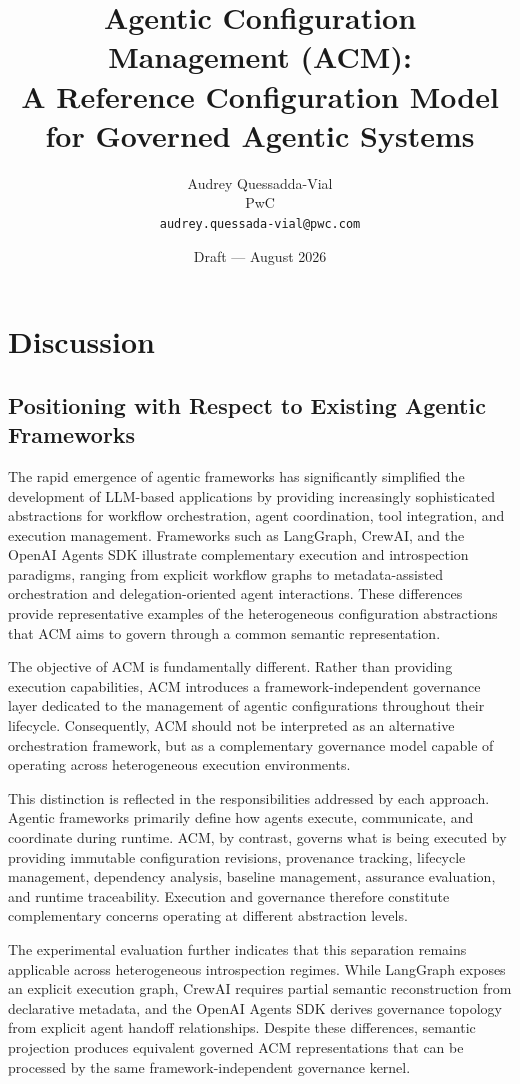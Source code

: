 \documentclass[10pt]{article}
\title{\textbf{Agentic Configuration Management (ACM):\\A Reference Configuration Model for Governed Agentic Systems}}
\author{
  Audrey Quessadda-Vial\\
  PwC\\
  \texttt{audrey.quessada-vial@pwc.com}
}
\date{Draft --- August 2026}
\begin{document}
\maketitle

\section{Discussion}
\label{sec:discussion}
\subsection{Positioning with Respect to Existing Agentic Frameworks}
\label{sec:positioning}

The rapid emergence of agentic frameworks has significantly simplified the development of LLM-based applications by providing increasingly sophisticated abstractions for workflow orchestration, agent coordination, tool integration, and execution management. Frameworks such as LangGraph, CrewAI, and the OpenAI Agents SDK illustrate complementary execution and introspection paradigms, ranging from explicit workflow graphs to metadata-assisted orchestration and delegation-oriented agent interactions. These differences provide representative examples of the heterogeneous configuration abstractions that ACM aims to govern through a common semantic representation.

The objective of ACM is fundamentally different. Rather than providing execution capabilities, ACM introduces a framework-independent governance layer dedicated to the management of agentic configurations throughout their lifecycle. Consequently, ACM should not be interpreted as an alternative orchestration framework, but as a complementary governance model capable of operating across heterogeneous execution environments.

This distinction is reflected in the responsibilities addressed by each approach. Agentic frameworks primarily define how agents execute, communicate, and coordinate during runtime. ACM, by contrast, governs what is being executed by providing immutable configuration revisions, provenance tracking, lifecycle management, dependency analysis, baseline management, assurance evaluation, and runtime traceability. Execution and governance therefore constitute complementary concerns operating at different abstraction levels.

The experimental evaluation further indicates that this separation remains applicable across heterogeneous introspection regimes. While LangGraph exposes an explicit execution graph, CrewAI requires partial semantic reconstruction from declarative metadata, and the OpenAI Agents SDK derives governance topology from explicit agent handoff relationships. Despite these differences, semantic projection produces equivalent governed ACM representations that can be processed by the same framework-independent governance kernel.
\end{document}
